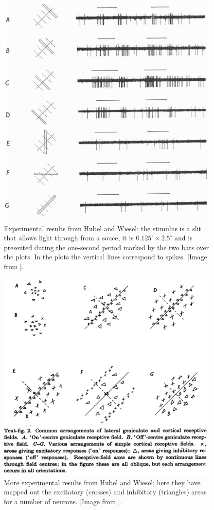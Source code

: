 \documentclass[11pt,a4paper]{scrartcl}
\begin{document}
\begin{figure}
\begin{center}
\includegraphics[width=12cm]{HW.png}
\end{center}
\caption{Experimental results from Hubel and Wiesel; the stimulus is a slit that allows light through from a souce, it is $0.125^\circ\times 2.5^\circ$ and is presented during the one-second period marked by the two bars over the plots. In the plots the vertical lines correspond to spikes. [Image from \cite{HubelWiesel1962a}].\label{fig:hw}}
\end{figure}


\begin{figure}
\begin{center}
\includegraphics[width=12cm]{HW_rf.png}
\end{center}
\caption{More experimental results from Hubel and Wiesel; here they have mapped out the excitatory (crosses) and inhibitory (triangles) areas for a number of neurons. [Image from \cite{HubelWiesel1962a}].\label{fig:hw_rf}}
\end{figure}
\end{document}
